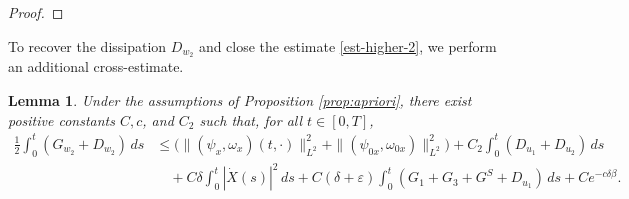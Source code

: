 \documentclass[11pt,reqno]{amsart}
\newtheorem{lemma}{Lemma}[section]
\numberwithin{equation}{section} %
\newcommand{\e}{\varepsilon}
\begin{document}
\begin{proof}
\end{proof}


To recover the dissipation $D_{w_2}$ and close the estimate \eqref{est-higher-2}, we perform an additional cross-estimate. 



\begin{lemma}
	Under the assumptions of Proposition \ref{prop:apriori}, there exist positive constants $C, c$, and $C_2$ such that, for all $t \in [0,T]$,
	\begin{equation} \label{est-higher-3}
		\begin{aligned}
		  \frac{1}{2}\int_0^t(G_{w_2}+D_{w_2})\,ds &\le \bigl(\|(\psi_x,\omega_x)(t,\cdot)\|_{L^2}^2+\|(\psi_{0x},\omega_{0x})\|_{L^2}^2 \bigr)+C_2\int_0^t(D_{u_1}+D_{u_2})\,ds\\
			&\quad+C\delta\int_0^t|\dot{X}(s)|^2\,ds +C(\delta+\e)\int_0^t(G_1+G_3+G^S+D_{u_1})\,ds +C e^{-c\delta \beta}.
		\end{aligned}
	\end{equation}
\end{lemma}
\end{document}
